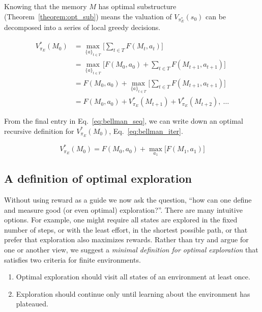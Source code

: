 \documentclass[9pt,twocolumn,twoside]{pnas-new}
\begin{document}
Knowing that the memory $M$ has optimal substructure (Theorem~\ref{theorem:opt_sub}) means the valuation of $V_{\pi_E^*}(s_0)$ can be decomposed into a series of local greedy decisions.

\begin{equation} \label{eq:bellman_seq}
    \begin{split}
        V^*_{\pi_E}(M_0) &= \max_{\{a\}_{t \in T}} \Big [\sum_{t \in T} F(M_t, a_t)\Big ]\\
                         &= \max_{\{a\}_{t \in T}} \Big [F(M_0, a_0) + \sum_{t \in T}F(M_{t+1}, a_{t+1})\Big ]\\
                         &= F(M_0, a_0) + \max_{\{a\}_{t \in T}} \Big [\sum_{t \in T} F(M_{t+1}, a_{t+1}) \Big ]\\
                         &= F(M_0, a_0) + V^*_{\pi_E}(M_{t+1}) + V^*_{\pi_E}(M_{t+2}),\ \ldots
    \end{split}
\end{equation}

From the final entry in Eq.~\ref{eq:bellman_seq}, we can write down an optimal recursive definition for $V^*_{\pi_E}(M_0)$, Eq.~\ref{eq:bellman_iter}.

\begin{equation} \label{eq:bellman_iter}
    V^*_{\pi_E}(M_0) = F(M_0, a_0) + \max_{a_1} \Big [F(M_1, a_1) \Big ]
\end{equation}
    

\subsection*{A definition of optimal exploration}
Without using reward as a guide we now ask the question, ``how can one define and measure good (or even optimal) exploration?''. There are many intuitive options. For example, one might require all states are explored in the fixed number of steps, or with the least effort, in the shortest possible path, or that prefer that exploration also maximizes rewards. Rather than try and argue for one or another view, we suggest a \textit{minimal definition for optimal exploration} that satisfies two criteria for finite environments. 

\begin{enumerate}[noitemsep,wide=0pt,leftmargin=\dimexpr\labelwidth+2\labelsep\relax]
    \item Optimal exploration should visit all states of an environment at least once. 
    \item Exploration should continue only until learning about the environment has plateaued. 
\end{enumerate}
\end{document}
